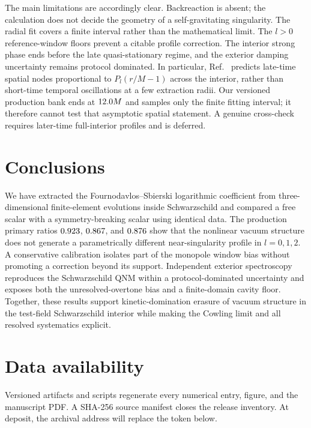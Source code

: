 \documentclass[
  aps,
  prd,
  reprint,
  superscriptaddress,
  nofootinbib,
  longbibliography
]{revtex4-2}
\begin{document}
The main limitations are accordingly clear.  Backreaction is absent; the
calculation does not decide the geometry of a self-gravitating singularity.
The radial fit covers a finite interval rather than the mathematical limit.
The $l>0$ reference-window floors prevent a citable profile correction.  The
interior strong phase ends before the late quasi-stationary regime, and the
exterior damping uncertainty remains protocol dominated.  In particular,
Ref.~\cite{ThuestadKhannaPrice2017} predicts late-time spatial nodes
proportional to $P_l(r/M-1)$ across the interior, rather than short-time
temporal oscillations at a few extraction radii.  Our versioned production
bank ends at $12.0 M$ and samples only the finite fitting
interval; it therefore cannot test that asymptotic spatial statement.  A
genuine cross-check requires later-time full-interior profiles and is deferred.

\section{Conclusions}
\label{sec:conclusions}

We have extracted the Fournodavlos--Sbierski logarithmic coefficient from
three-dimensional finite-element evolutions inside Schwarzschild and compared
a free scalar with a symmetry-breaking scalar using identical data.
The production primary ratios $0.923$, $0.867$, and $0.876$ show
that the nonlinear vacuum structure does not generate a parametrically
different near-singularity profile in $l=0,1,2$.  A conservative calibration
isolates part of the monopole window bias without promoting a correction
beyond its support.  Independent exterior spectroscopy reproduces the
Schwarzschild QNM within a protocol-dominated uncertainty and exposes both
the unresolved-overtone bias and a finite-domain cavity floor.  Together,
these results support kinetic-domination erasure of vacuum structure in the
test-field Schwarzschild interior while making the Cowling limit and all
resolved systematics explicit.

\section{Data availability}

Versioned artifacts and scripts regenerate every numerical entry, figure, and
the manuscript PDF.  A SHA-256 source manifest closes the release inventory.
At deposit, the archival address will replace the token below.
\end{document}

